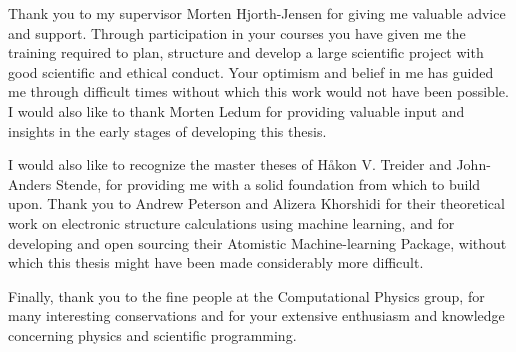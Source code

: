 Thank you to my supervisor Morten Hjorth-Jensen for giving
me valuable advice and support. Through participation in
your courses you have given me the training required to plan,
structure and develop a large scientific project with good scientific
and ethical conduct. Your optimism and belief in me has guided
me through difficult times without which this work would not have been possible.
I would also like to thank Morten Ledum for providing valuable input
and insights in the early stages of developing this thesis.
\par
I would also like to recognize the master theses of Håkon V. Treider
and John-Anders Stende, for providing me with a solid foundation from which
to build upon. Thank you to Andrew Peterson and Alizera Khorshidi
for their theoretical work on electronic structure calculations
using machine learning, and for developing and open sourcing
their Atomistic Machine-learning Package, without which this
thesis might have been made considerably more difficult.
\par
Finally, thank you to the fine people at the Computational Physics
group, for many interesting conservations and for your extensive
enthusiasm and knowledge concerning physics and scientific programming.
